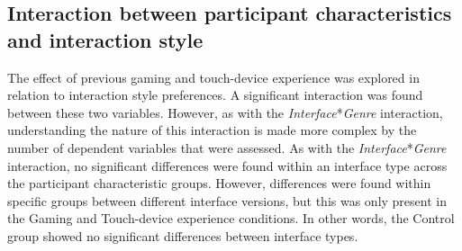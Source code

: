 \subsection{Interaction between participant characteristics and interaction style}
The effect of previous gaming and touch-device experience was explored in relation to interaction style preferences. A significant interaction was found between these two variables. However, as with the \emph{Interface}*\emph{Genre} interaction, understanding the nature of this interaction is made more complex by the number of dependent variables that were assessed. As with the \emph{Interface}*\emph{Genre} interaction, no significant differences were found within an interface type across the participant characteristic groups. However, differences were found within specific groups between different interface versions, but this was only present in the Gaming and Touch-device experience conditions. In other words, the Control group showed no significant differences between interface types.

